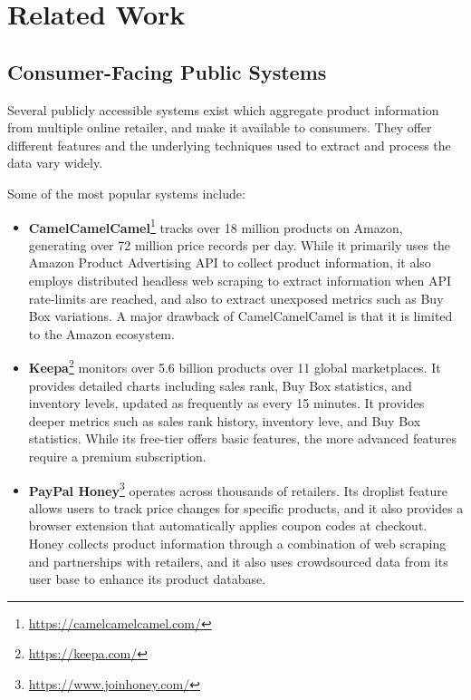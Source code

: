 \section{Related Work}\label{sec:related_work}

\subsection{Consumer-Facing Public Systems}\label{sec:related_work_public_systems}
Several publicly accessible systems exist which aggregate product information from multiple online retailer, and make it available to consumers.
They offer different features and the underlying techniques used to extract and process the data vary widely.

Some of the most popular systems include:
\begin{itemize}

    \item \textbf{CamelCamelCamel}\footnote{\url{https://camelcamelcamel.com/}} tracks over 18 million products on Amazon,
    generating over 72 million price records per day.
    While it primarily uses the Amazon Product Advertising API to collect product information, it also employs distributed headless
    web scraping to extract information when API rate-limits are reached, and also to extract unexposed metrics such as
    Buy Box variations.
    A major drawback of CamelCamelCamel is that it is limited to the Amazon ecosystem.\cite{systemdesignhandbook_camelcamelcamel}

    \item \textbf{Keepa}\footnote{\url{https://keepa.com/}} monitors over 5.6 billion products over 11 global marketplaces.
    It provides detailed charts including sales rank, Buy Box statistics, and inventory levels, updated as frequently as every 15 minutes.
    It provides deeper metrics such as sales rank history, inventory leve, and Buy Box statistics.
    While its free-tier offers basic features, the more advanced features require a premium subscription.\cite{harpa_price_trackers}

    \item \textbf{PayPal Honey}\footnote{\url{https://www.joinhoney.com/}} operates across thousands of retailers.
    Its droplist feature allows users to track price changes for specific products, and it also provides a browser extension that automatically applies coupon codes at checkout.
    Honey collects product information through a combination of web scraping and partnerships with retailers, and it also uses crowdsourced data from its user base to enhance its product database.\cite{paypal_honey_guide}


\end{itemize}
